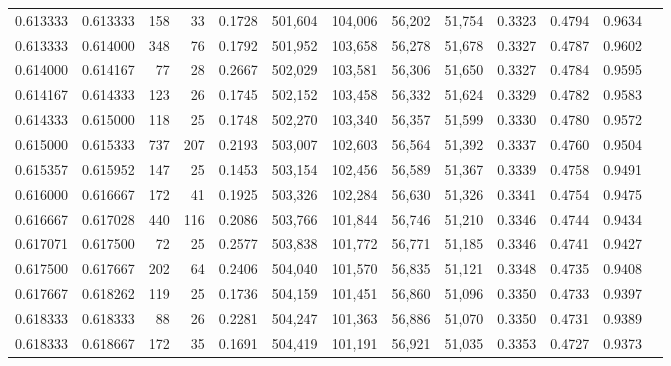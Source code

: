 \begin{tabular}{rrrrrrrrrrrrr}
0.613333 & 0.613333 &   158 &  33 &                                     0.1728 & 501,604 & 104,006 &  56,202 &  51,754 & 0.3323 & 0.4794 & 0.9634 \\
0.613333 & 0.614000 &   348 &  76 &                                     0.1792 & 501,952 & 103,658 &  56,278 &  51,678 & 0.3327 & 0.4787 & 0.9602 \\
0.614000 & 0.614167 &    77 &  28 &                                     0.2667 & 502,029 & 103,581 &  56,306 &  51,650 & 0.3327 & 0.4784 & 0.9595 \\
0.614167 & 0.614333 &   123 &  26 &                                     0.1745 & 502,152 & 103,458 &  56,332 &  51,624 & 0.3329 & 0.4782 & 0.9583 \\
0.614333 & 0.615000 &   118 &  25 &                                     0.1748 & 502,270 & 103,340 &  56,357 &  51,599 & 0.3330 & 0.4780 & 0.9572 \\
0.615000 & 0.615333 &   737 & 207 &                                     0.2193 & 503,007 & 102,603 &  56,564 &  51,392 & 0.3337 & 0.4760 & 0.9504 \\
0.615357 & 0.615952 &   147 &  25 &                                     0.1453 & 503,154 & 102,456 &  56,589 &  51,367 & 0.3339 & 0.4758 & 0.9491 \\
0.616000 & 0.616667 &   172 &  41 &                                     0.1925 & 503,326 & 102,284 &  56,630 &  51,326 & 0.3341 & 0.4754 & 0.9475 \\
0.616667 & 0.617028 &   440 & 116 &                                     0.2086 & 503,766 & 101,844 &  56,746 &  51,210 & 0.3346 & 0.4744 & 0.9434 \\
0.617071 & 0.617500 &    72 &  25 &                                     0.2577 & 503,838 & 101,772 &  56,771 &  51,185 & 0.3346 & 0.4741 & 0.9427 \\
0.617500 & 0.617667 &   202 &  64 &                                     0.2406 & 504,040 & 101,570 &  56,835 &  51,121 & 0.3348 & 0.4735 & 0.9408 \\
0.617667 & 0.618262 &   119 &  25 &                                     0.1736 & 504,159 & 101,451 &  56,860 &  51,096 & 0.3350 & 0.4733 & 0.9397 \\
0.618333 & 0.618333 &    88 &  26 &                                     0.2281 & 504,247 & 101,363 &  56,886 &  51,070 & 0.3350 & 0.4731 & 0.9389 \\
0.618333 & 0.618667 &   172 &  35 &                                     0.1691 & 504,419 & 101,191 &  56,921 &  51,035 & 0.3353 & 0.4727 & 0.9373 \\

\end{tabular}

